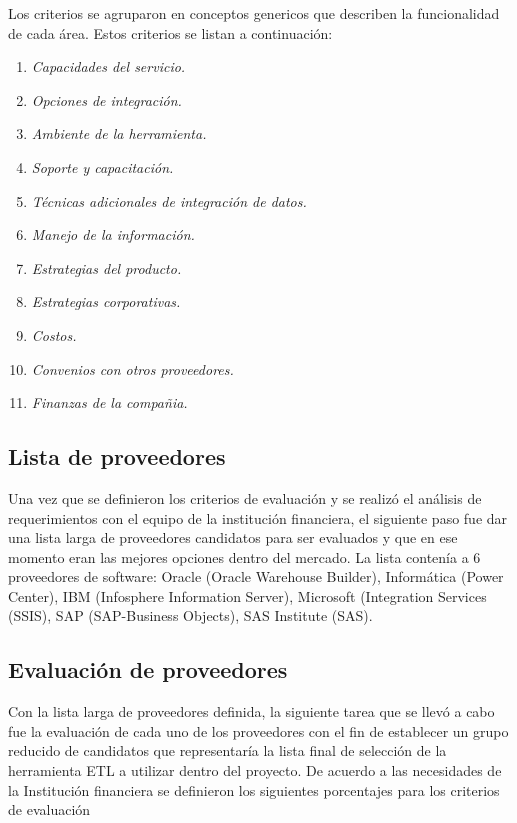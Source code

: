 \documentclass[a4paper,openright,12pt]{book}
\begin{document}
Los criterios se agruparon en conceptos genericos que describen la funcionalidad
de cada área. Estos criterios se listan a continuación:

\begin{enumerate}
\item \textit{Capacidades del servicio.}
\item \textit{Opciones de integración.}
\item \textit{Ambiente de la herramienta.}
\item \textit{Soporte y capacitación.}
\item \textit{Técnicas adicionales de integración de datos.}
\item \textit{Manejo de la información.}
\item \textit{Estrategias del producto.}
\item \textit{Estrategias corporativas.}
\item \textit{Costos.}
\item \textit{Convenios con otros proveedores.}
\item \textit{Finanzas de la compañia.}
\end{enumerate}

\subsection{Lista de proveedores}

Una vez que se definieron los criterios de evaluación y se realizó el análisis
de requerimientos con el equipo de la institución financiera, el siguiente paso
fue dar una lista larga de proveedores candidatos para ser evaluados y que en
ese momento eran las mejores opciones dentro del mercado. La lista contenía a 6
proveedores de software: Oracle (Oracle Warehouse Builder), Informática (Power
Center), IBM (Infosphere Information Server), Microsoft (Integration Services
(SSIS), SAP (SAP-Business Objects), SAS Institute (SAS).

\subsection{Evaluación de proveedores}

Con la lista larga de proveedores definida, la siguiente tarea que se llevó a
cabo fue la evaluación de cada uno de los proveedores con el fin de establecer
un grupo reducido de candidatos que representaría la lista final de selección de
la herramienta ETL a utilizar dentro del proyecto. De acuerdo a las necesidades
de la Institución financiera se definieron los siguientes porcentajes para los
criterios de evaluación
\end{document}
